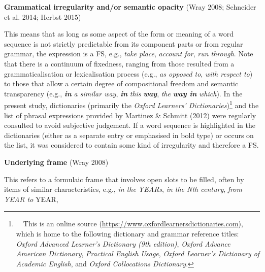 \begin{styleStandard}
\textbf{Grammatical irregularity and/or semantic opacity} (Wray 2008; Schneider et al. 2014; Herbst 2015)
\end{styleStandard}

\begin{styleStandard}
This means that as long as some aspect of the form or meaning of a word sequence is not strictly predictable from its component parts or from regular grammar, the expression is a FS, e.g., \textit{take place}, \textit{account for},\textit{ run through}. Note that there is a continuum of fixedness, ranging from those resulted from a grammaticalisation or lexicalisation process (e.g., \textit{as opposed to}, \textit{with respect to}) to those that allow a certain degree of compositional freedom and semantic transparency (e.g., \textbf{\textit{in}}\textit{ a similar way}, \textbf{\textit{in}}\textit{ this }\textbf{\textit{way}}, \textit{the }\textbf{\textit{way in}}\textit{ which}). In the present study, dictionaries (primarily the \textit{Oxford Learners’ Dictionaries})\footnote{\textrm{\ \ This is an online source (}\url{https://www.oxfordlearnersdictionaries.com}\textrm{), which is home to the following dictionary and grammar reference titles: }\textrm{\textit{Oxford Advanced Learner’s Dictionary (9th edition)}}\textrm{, }\textrm{\textit{Oxford Advance American Dictionary}}\textrm{, }\textrm{\textit{Practical English Usage}}\textrm{, }\textrm{\textit{Oxford Learner’s Dictionary of Academic English}}\textrm{, and }\textrm{\textit{Oxford Collocations Dictionary}}\textrm{.}} and the list of phrasal expressions provided by Martinez \& Schmitt (2012) were regularly consulted to avoid subjective judgement. If a word sequence is highlighted in the dictionaries (either as a separate entry or emphasised in bold type) or occurs on the list, it was considered to contain some kind of irregularity and therefore a FS.
\end{styleStandard}

\begin{styleStandard}
\textbf{Underlying frame} (Wray 2008)
\end{styleStandard}

\begin{styleStandard}
This refers to a formulaic frame that involves open slots to be filled, often by items of similar characteristics, e.g., \textit{in the YEARs}, \textit{in the Nth century}, \textit{from YEAR to} YEAR, 
\end{styleStandard}

